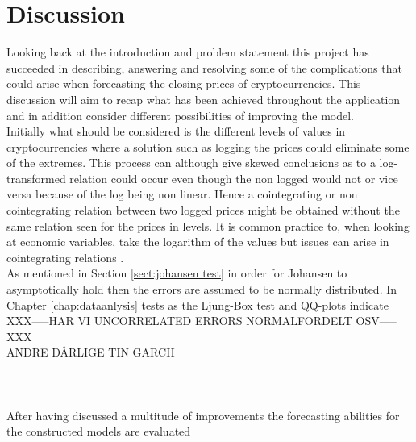 \chapter{Discussion}
Looking back at the introduction and problem statement this project has succeeded in describing, answering and resolving some of the complications that could arise when forecasting the closing prices of cryptocurrencies. This discussion will aim to recap what has been achieved throughout the application and in addition consider different possibilities of improving the model.\\
Initially what should be considered is the different levels of values in cryptocurrencies where a solution such as logging the prices could eliminate some of the extremes. This process can although give skewed conclusions as to a log-transformed relation could occur even though the non logged would not or vice versa because of the log being non linear. Hence a cointegrating or non cointegrating relation between two logged prices might be obtained without the same relation seen for the prices in levels. It is common practice to, when looking at economic variables, take the logarithm of the values but issues can arise in cointegrating relations \cite{cointegrationloggedissues}.\\
As mentioned in Section \ref{sect:johansen test} in order for Johansen to asymptotically hold then the errors are assumed to be normally distributed. In Chapter \ref{chap:dataanlysis} tests as the Ljung-Box test and QQ-plots indicate XXX-----HAR VI UNCORRELATED ERRORS NORMALFORDELT OSV-----XXX\\
ANDRE DÅRLIGE TIN
GARCH\\\\\\\\
After having discussed a multitude of improvements the forecasting abilities for the constructed models are evaluated

